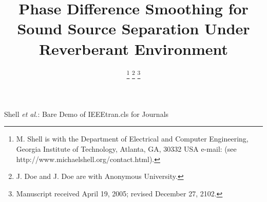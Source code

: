 \documentclass[journal]{IEEEtran}
\begin{document}
%
\title{Phase Difference Smoothing for Sound Source Separation Under Reverberant Environment}
%
%
%

\author{
\thanks{M. Shell is with the Department
of Electrical and Computer Engineering, Georgia Institute of Technology, Atlanta,
GA, 30332 USA e-mail: (see http://www.michaelshell.org/contact.html).}%
\thanks{J. Doe and J. Doe are with Anonymous University.}%
\thanks{Manuscript received April 19, 2005; revised December 27, 2102.}}

% 
%



%
{Shell \MakeLowercase{\textit{et al.}}: Bare Demo of IEEEtran.cls for Journals}
% 
\end{document}
